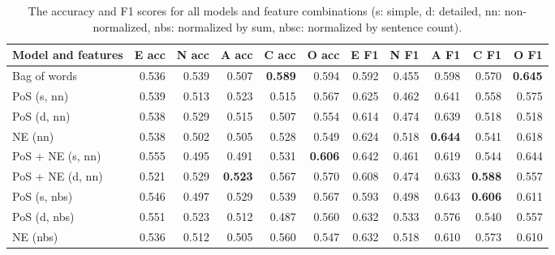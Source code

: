 \documentclass[10pt, a4paper]{article}
\begin{document}
\begin{table}
  \caption{The accuracy and F1 scores for all models and feature combinations (s: simple, d: detailed, nn: non-normalized, nbs: normalized by sum, nbsc: normalized by sentence count).}
  \begin{center}
  \begin{tabular}{lrrrrrrrrrr}
    \toprule
    Model and features  &  E acc         & N acc          & A acc          & C acc          &  O acc         & E F1           & N F1           & A F1           & C F1           & O F1\\
    \midrule
          Bag of words & 0.536          & 0.539          & 0.507          & \textbf{0.589} & 0.594          & 0.592          & 0.455          & 0.598          & 0.570          &  \textbf{0.645}\\
           PoS (s, nn) & 0.539          & 0.513          & 0.523          & 0.515          & 0.567          & 0.625          & 0.462          & 0.641          & 0.558          &  0.575\\
           PoS (d, nn) & 0.538          & 0.529          & 0.515          & 0.507          & 0.554          & 0.614          & 0.474          & 0.639          & 0.518          &  0.518\\
               NE (nn) & 0.538          & 0.502          & 0.505          & 0.528          & 0.549          & 0.624          & 0.518          & \textbf{0.644} & 0.541          &  0.618\\
      PoS + NE (s, nn) & 0.555          & 0.495          & 0.491          & 0.531          & \textbf{0.606} & 0.642          & 0.461          & 0.619          & 0.544          &  0.644\\
      PoS + NE (d, nn) & 0.521          & 0.529          & \textbf{0.523} & 0.567          & 0.570          & 0.608          & 0.474          & 0.633          & \textbf{0.588} &  0.557\\
          PoS (s, nbs) & 0.546          & 0.497          & 0.529          & 0.539          & 0.567          & 0.593          & 0.498          & 0.643          & \textbf{0.606} &  0.611\\
          PoS (d, nbs) & 0.551          & 0.523          & 0.512          & 0.487          & 0.560          & 0.632          & 0.533          & 0.576          & 0.540          &  0.557\\
              NE (nbs) & 0.536          & 0.512          & 0.505          & 0.560          & 0.547          & 0.632          & 0.518          & 0.610          & 0.573          &  0.610\\

\end{tabular}
\end{center}
\end{table}
\end{document}
